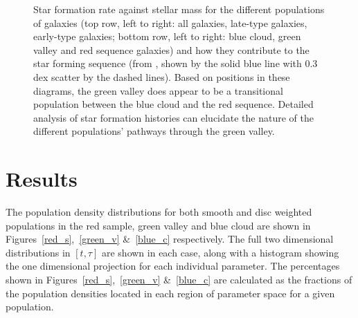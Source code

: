 \begin{figure}
\caption[SFR-stellar mass plane split by morphology and colour]{Star formation rate against stellar mass for the different populations of galaxies (top row, left to right: all galaxies, late-type galaxies, early-type galaxies; bottom row, left to right: blue cloud, green valley and red sequence galaxies) and how they contribute to the star forming sequence (from \citet{peng10}, shown by the solid blue line with 0.3 dex scatter by the dashed lines). Based on positions in these diagrams, the green valley does appear to be a transitional population between the blue cloud and the red sequence. Detailed analysis of star formation histories can elucidate the nature of the different populations' pathways through the green valley.}
\label{sfr_mass_sub}
\end{figure}


\section{Results}\label{sec:morphresults}

The population density distributions for both smooth and disc weighted populations in the red sample, green valley and blue cloud are shown in Figures~\ref{red_s},~\ref{green_v} \&~\ref{blue_c} respectively. The full two dimensional distributions in $[t, \tau]$ are shown in each case, along with a histogram showing the one dimensional projection for each individual parameter. The percentages shown in Figures~\ref{red_s},~\ref{green_v} \&~\ref{blue_c} are calculated as the fractions of the population densities located in each region of parameter space for a given population. 

